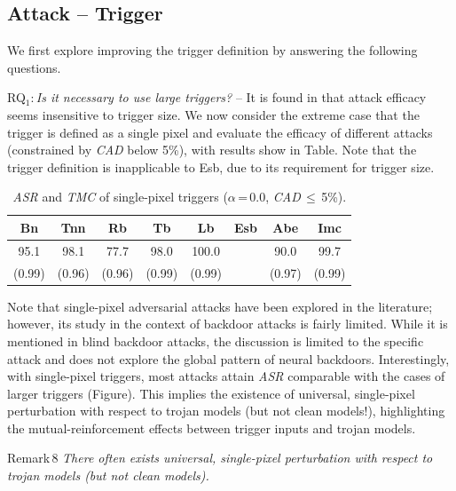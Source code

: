 \documentclass[compsoc,conference,a4paper,10pt,times]{IEEEtran}
\newcommand{\bn}{{\sc Bn}\xspace}
\newcommand{\tnn}{{\sc Tnn}\xspace}
\newcommand{\tb}{{\sc Tb}\xspace}
\newcommand{\lb}{{\sc Lb}\xspace}
\newcommand{\esb}{{\sc Esb}\xspace}
\newcommand{\rfb}{{\sc Rb}\xspace}
\newcommand{\abe}{{\sc Abe}\xspace}
\newcommand{\imc}{{\sc Imc}\xspace}
\newcommand{\asr}{{\em \small ASR}\xspace}
\newcommand{\cad}{{\em \small CAD}\xspace}
\newcommand{\tmc}{{\em \small TMC}\xspace}
\begin{document}
\subsection{Attack -- Trigger}

We first explore improving the trigger definition by answering the following questions.


\vspace{2pt}
{RQ$_1$:\,{\em Is it necessary to use large triggers?}} -- It is found in  that attack efficacy seems insensitive to trigger size. We now consider the extreme case that the trigger is defined as a single pixel and evaluate the efficacy of different attacks (constrained by \cad below 5\%), with results show in Table. Note that the trigger definition is inapplicable to \esb, due to its requirement for trigger size. 

\begin{table}[!ht]{\footnotesize
\centering
\renewcommand{\arraystretch}{1.2}
\setlength{\tabcolsep}{3pt}
\begin{tabular}{c|c|c|c|c|c|c|c}
    \bn & \tnn & \rfb & \tb & \lb & \esb & \abe & \imc \\
\hline
\hline 
95.1 & 98.1 & 77.7 & 98.0 & \cellcolor{Red}100.0 & \cellcolor{Gray} & 90.0 & 99.7 \\
(0.99)  & (0.96) & (0.96) &(0.99) & \cellcolor{Red}(0.99) & \cellcolor{Gray} & (0.97) & (0.99) 
\end{tabular}
\caption{\footnotesize \asr and \tmc of single-pixel triggers ($\alpha$\,=\,0.0, \cad\,$\leq$\,5\%).\label{tab:one-pixel} }}
\end{table}


Note that single-pixel adversarial attacks have been explored in the literature; however, its study in the context of backdoor attacks is fairly limited. While it is mentioned in blind backdoor attacks, the discussion is limited to the specific attack and does not explore the global pattern of neural backdoors. Interestingly, with single-pixel triggers, most attacks attain \asr comparable with the cases of larger triggers (\mcf Figure). This implies the existence of universal, single-pixel perturbation with respect to trojan models (but not clean models!), highlighting the mutual-reinforcement effects between trigger inputs and trojan models. 

\begin{mtbox}{\small Remark\,8}
    {\em \small There often exists universal, single-pixel perturbation with respect to trojan models (but not clean models).}
\end{mtbox}
\end{document}
